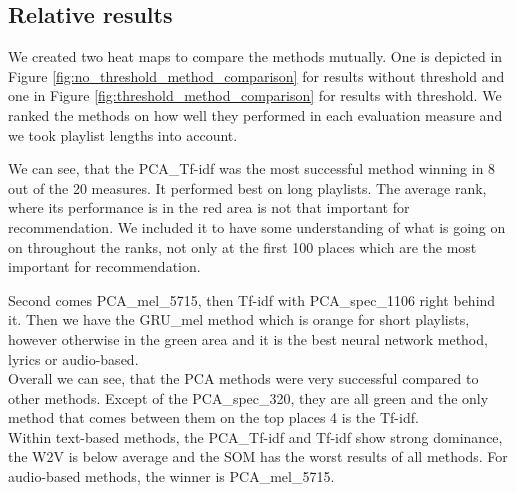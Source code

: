 \subsection{Relative results}\label{ssec:relative_comparison}

We created two heat maps to compare the methods mutually. One is depicted in Figure \ref{fig:no_threshold_method_comparison} for results without threshold and one in Figure \ref{fig:threshold_method_comparison} for results with threshold. We ranked the methods on how well they performed in each evaluation measure and we took playlist lengths into account. 

We can see, that the PCA\_Tf-idf was the most successful method winning in 8 out of the 20 measures. It performed best on long playlists. The average rank, where its performance is in the red area is not that important for recommendation. We included it to have some understanding of what is going on on throughout the ranks, not only at the first 100 places which are the most important for recommendation.

Second comes PCA\_mel\_5715, then Tf-idf with PCA\_spec\_1106 right behind it. Then we have the GRU\_mel method which is orange for short playlists, however otherwise in the green area and it is the best neural network method, lyrics or audio-based. \\
Overall we can see, that the PCA methods were very successful compared to other methods. Except of the PCA\_spec\_320, they are all green and the only method that comes between them on the top places 4 is the Tf-idf. \\
Within text-based methods, the PCA\_Tf-idf and Tf-idf show strong dominance, the W2V is below average and the SOM has the worst results of all methods. For audio-based methods, the winner is PCA\_mel\_5715. \\

